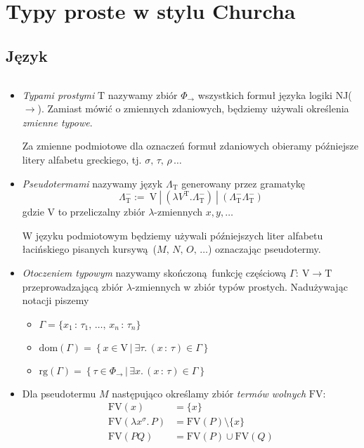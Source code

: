\section{Typy proste w stylu Churcha}

\subsection{Język}

\begin{definicja}$ $\newline
\begin{itemize}
\item
  \emph{Typami prostymi} \(\mathrm{T}\) nazywamy zbiór \(\Phi_{\to}\) wszystkich formuł języka logiki NJ(\(\to\)). 
    Zamiast mówić o zmiennych zdaniowych, będziemy używali określenia \emph{zmienne typowe}.

    Za zmienne podmiotowe dla oznaczeń formuł zdaniowych obieramy późniejsze litery alfabetu greckiego, tj. \(\sigma,\, \tau,\, \rho\,\dots\)
\item
  \emph{Pseudotermami} nazywamy język \(\Lambda_{\mathrm{T}}\) generowany przez
gramatykę 
\[
  \Lambda^{-}_{\mathrm{T}} := \ \mathrm{V}\ | \ \left (\lambda V^{\mathrm{T}} . \Lambda^{-}_{\mathrm{T}}\right) \ | \ \left (\Lambda^{-}_{\mathrm{T}}\Lambda^{-}_{\mathrm{T}}\right)
\]
    gdzie V to przeliczalny zbiór \(\lambda\)-zmiennych \(x, y, \dots\)
    
    W języku podmiotowym będziemy używali późniejszych liter alfabetu łacińskiego pisanych kursywą (\(M,\, N,\, O,\, \dots\)) oznaczając pseudotermy.
  \item \emph{Otoczeniem typowym} nazywamy skończoną funkcję częściową \(\Gamma:\:\mathrm{V}\to\mathrm{T}\) przeprowadzającą zbiór \(\lambda\)-zmiennych w zbiór typów prostych. Nadużywając notacji piszemy
    \begin{itemize}
      \item \(\Gamma=\{x_1\,:\,\tau_1,\,\dots,\,x_n\,:\,\tau_n\}\)
      \item \(\mathrm{dom}(\Gamma) = \left\{x\in \mathrm{V}\,|\:\exists\tau.\,(x\,:\,\tau)\in\Gamma\right\}\)
      \item \(\mathrm{rg}(\Gamma)=\left\{\tau\in\Phi_{\to}\,|\,\exists x.\,(x\,:\,\tau)\in\Gamma\right\}\)
    \end{itemize}

  \item Dla pseudotermu \(M\) następująco określamy zbiór \emph{termów wolnych} \(\mathrm{FV}\):
    \begin{align*}
      \mathrm{FV}(x) &= \{x\}\\
      \mathrm{FV}(\lambda x^\sigma .\, P)  &= \mathrm{FV}(P)\setminus\{x\}\\
      \mathrm{FV}(P Q) &= \mathrm{FV}(P)\cup\mathrm{FV}(Q)
    \end{align*}


\end{itemize}
\end{definicja}
